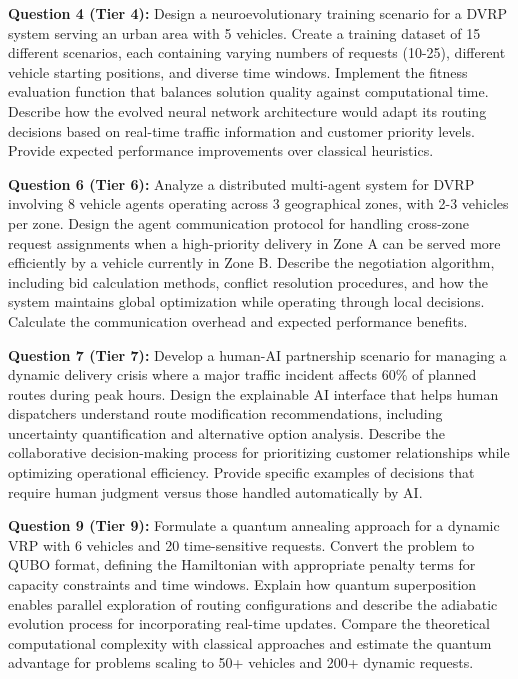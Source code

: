 \documentclass{article}
\begin{document}
\textbf{Question 4 (Tier 4):} Design a neuroevolutionary training scenario for a DVRP system serving an urban area with 5 vehicles. Create a training dataset of 15 different scenarios, each containing varying numbers of requests (10-25), different vehicle starting positions, and diverse time windows. Implement the fitness evaluation function that balances solution quality against computational time. Describe how the evolved neural network architecture would adapt its routing decisions based on real-time traffic information and customer priority levels. Provide expected performance improvements over classical heuristics.

\textbf{Question 6 (Tier 6):} Analyze a distributed multi-agent system for DVRP involving 8 vehicle agents operating across 3 geographical zones, with 2-3 vehicles per zone. Design the agent communication protocol for handling cross-zone request assignments when a high-priority delivery in Zone A can be served more efficiently by a vehicle currently in Zone B. Describe the negotiation algorithm, including bid calculation methods, conflict resolution procedures, and how the system maintains global optimization while operating through local decisions. Calculate the communication overhead and expected performance benefits.

\textbf{Question 7 (Tier 7):} Develop a human-AI partnership scenario for managing a dynamic delivery crisis where a major traffic incident affects 60\% of planned routes during peak hours. Design the explainable AI interface that helps human dispatchers understand route modification recommendations, including uncertainty quantification and alternative option analysis. Describe the collaborative decision-making process for prioritizing customer relationships while optimizing operational efficiency. Provide specific examples of decisions that require human judgment versus those handled automatically by AI.

\textbf{Question 9 (Tier 9):} Formulate a quantum annealing approach for a dynamic VRP with 6 vehicles and 20 time-sensitive requests. Convert the problem to QUBO format, defining the Hamiltonian with appropriate penalty terms for capacity constraints and time windows. Explain how quantum superposition enables parallel exploration of routing configurations and describe the adiabatic evolution process for incorporating real-time updates. Compare the theoretical computational complexity with classical approaches and estimate the quantum advantage for problems scaling to 50+ vehicles and 200+ dynamic requests.
\end{document}
